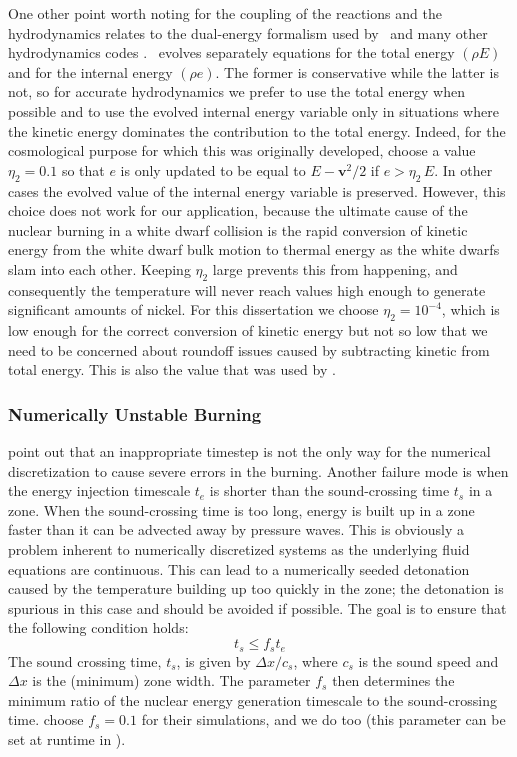\documentclass[12pt]{article}
\begin{document}
One other point worth noting for the coupling of the reactions
and the hydrodynamics relates to the dual-energy formalism used
by \castro\ and many other hydrodynamics codes \cite{bryan:1995}.
\castro\ evolves separately equations for the total energy $(\rho E)$ and
for the internal energy $(\rho e)$. The former is conservative while the latter
is not, so for accurate hydrodynamics we prefer to use the total
energy when possible and to use the evolved internal energy variable
only in situations where the kinetic energy dominates the contribution
to the total energy. Indeed, for the cosmological purpose for which
this was originally developed, \cite{ENZO} choose a value $\eta_2 = 0.1$
so that $e$ is only updated to be equal to $E - \mathbf{v}^2/2$ if
$e > \eta_2\, E$. In other cases the evolved value of the internal
energy variable is preserved. However, this choice does not work
for our application, because the ultimate cause of the nuclear
burning in a white dwarf collision is the rapid conversion of
kinetic energy from the white dwarf bulk motion to thermal energy
as the white dwarfs slam into each other. Keeping $\eta_2$ large
prevents this from happening, and consequently the temperature
will never reach values high enough to generate significant
amounts of nickel. For this dissertation we choose $\eta_2 = 10^{-4}$,
which is low enough for the correct conversion of kinetic energy
but not so low that we need to be concerned about roundoff issues
caused by subtracting kinetic from total energy. This is also
the value that was used by \cite{hawley:2012}.

\subsubsection{Numerically Unstable Burning}
\label{sec:unstable_burning}

\citet{kushnir:2013} point out that an inappropriate timestep is 
not the only way for the numerical discretization to cause 
severe errors in the burning. Another failure mode is when
the energy injection timescale
$t_e$ is shorter than the sound-crossing time $t_s$ in a zone.
When the sound-crossing time is too long, energy is built up in
a zone faster than it can be advected away by pressure waves.
This is obviously a problem inherent to numerically discretized
systems as the underlying fluid equations are continuous.
This can lead to a numerically seeded detonation caused by the
temperature building up too quickly in the zone; the detonation
is spurious in this case and should be avoided if possible.
The goal is to ensure that the following condition holds:
\begin{equation}
  t_s \leq f_{s} t_e \label{eq:burning_limiter_2}
\end{equation}
The sound crossing time, $t_s$, is given by $\Delta x / c_s$, 
where $c_s$ is the sound speed and $\Delta x$ is the (minimum) 
zone width. The parameter $f_{s}$ then determines the minimum
ratio of the nuclear energy generation timescale to the 
sound-crossing time. \citet{kushnir:2013} choose $f_{s} = 0.1$ 
for their simulations, and we do too (this parameter can be set 
at runtime in \castro).
\end{document}
